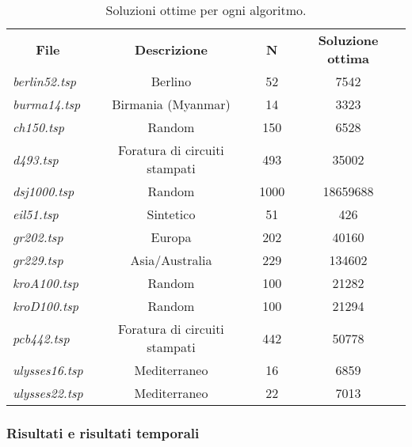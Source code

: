 \begin{table}[H]
  \centering
  \begin{tabular}{|lccc|}
  \multicolumn{1}{c}{\textbf{File}} & \textbf{Descrizione}          & \textbf{N} & \textbf{Soluzione ottima} \\
  \textit{berlin52.tsp}             & Berlino                       & 52         & 7542                      \\
  \textit{burma14.tsp}              & Birmania (Myanmar)            & 14         & 3323                      \\
  \textit{ch150.tsp}                & Random                        & 150        & 6528                      \\
  \textit{d493.tsp}                 & Foratura di circuiti stampati & 493        & 35002                     \\
  \textit{dsj1000.tsp}              & Random                        & 1000       & 18659688                  \\
  \textit{eil51.tsp}                & Sintetico                     & 51         & 426                       \\
  \textit{gr202.tsp}                & Europa                        & 202        & 40160                     \\
  \textit{gr229.tsp}                & Asia/Australia                & 229        & 134602                    \\
  \textit{kroA100.tsp}              & Random                        & 100        & 21282                     \\
  \textit{kroD100.tsp}              & Random                        & 100        & 21294                     \\
  \textit{pcb442.tsp}               & Foratura di circuiti stampati & 442        & 50778                     \\
  \textit{ulysses16.tsp}            & Mediterraneo                  & 16         & 6859                      \\
  \textit{ulysses22.tsp}            & Mediterraneo                  & 22         & 7013                     
  \end{tabular}
  \caption{Soluzioni ottime per ogni algoritmo.}
  \label{tab:my-table}
  \end{table}

\subsubsection{Risultati e risultati temporali}


